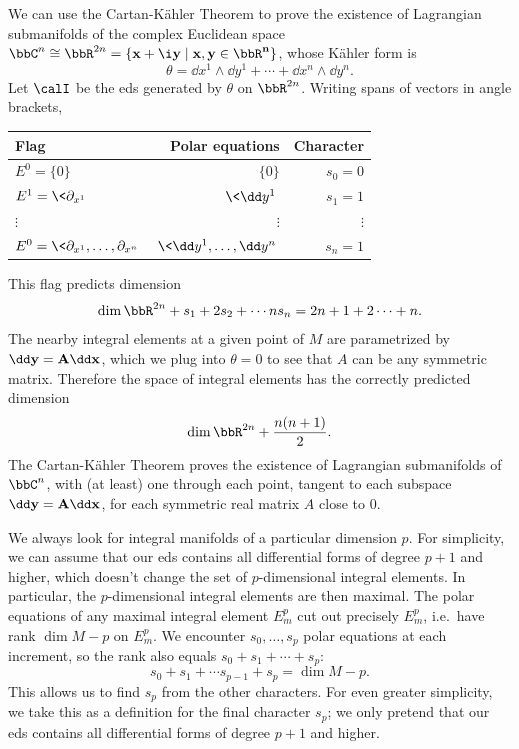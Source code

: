 \begin{example}
    We can use the Cartan-K\"ahler Theorem to prove the existence of Lagrangian submanifolds of the complex Euclidean space $\bbC^n\cong \bbR^{2n}=\{\bf{x}+\i \bf{y}\mid \bf{x},\bf{y}\in\bbR^n\}$, whose K\"ahler form is 
    \[\theta= \dd x^1\wedge \dd y^1+\cdots +\dd x^n\wedge \dd y^n.\]
    Let $\calI$ be the \gls{eds} generated by $\theta$ on $\bbR^{2n}$. Writing spans of vectors in angle brackets, 
    \begin{center}
        \begin{tabular}{l r r} 
         Flag & Polar equations & Character \\ [0.5ex] 
         \hline
         $E^0=\{0\}$ & $\{0\}$ & $s_0=0$ \\ 
         $E^1=\<\partial_{x^1}\>$ & $\<\dd y^1\>$ & $s_1=1$ \\ 
         $\vdots $ & $\vdots $ & $\vdots $ \\ 
         $E^0=\<\partial_{x^1},\ldots,\partial_{x^n}\>$ & $\<\dd y^1,\ldots,\dd y^n\>$ & $s_n=1$ \\ 
         \hline
        \end{tabular}
        \end{center}
        This flag predicts dimension 
        \[\dim \bbR^{2n}+s_1+2s_2+\cdots ns_n=2n+1+2\cdots +n.\]
        The nearby integral elements at a given point of $M$ are parametrized by $\dd \bf{y}=A\dd \bf{x}$, which we plug into $\theta=0$ to see that $A$ can be any symmetric matrix. Therefore the space of integral elements has the correctly predicted dimension
        \[\dim\bbR^{2n}+\frac{n(n+1)}{2}.\]
        The Cartan-K\"ahler Theorem proves the existence of Lagrangian submanifolds of $\bbC^n$, with (at least) one through each point, tangent to each subspace $\dd\bf{y}=A\dd\bf{x}$, for each symmetric real matrix $A$ close to $0$.
\end{example}

We always look for integral manifolds of a particular dimension $p$. For simplicity, we can assume that our \gls{eds} contains all differential forms of degree $p+1$ and higher, which doesn't change the set of $p$-dimensional integral elements. In particular, the $p$-dimensional integral elements are then maximal. The polar equations of any maximal integral element $E^p_m$ cut out precisely $E^p_m$, i.e.\ have rank $\dim M-p$ on $E^p_m$. We encounter $s_0,\ldots,s_p$ polar equations at each increment, so the rank also equals $s_0+s_1+\cdots +s_p$:
\[s_0+s_1+\cdots s_{p-1}+s_p=\dim M-p.\label{eq final character}\]
This allows us to find $s_p$ from the other characters. For even greater simplicity, we take this as a definition for the final character $s_p$; we only pretend that our \gls{eds} contains all differential forms of degree $p+1$ and higher.



